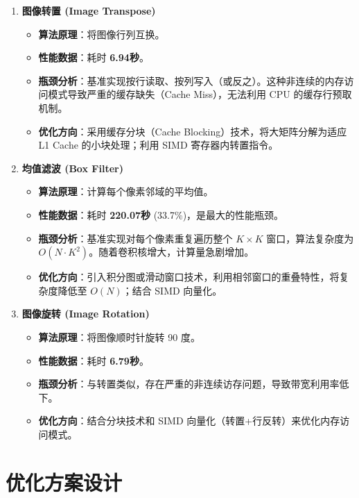 \documentclass[a4paper]{article}
\begin{document}
\begin{enumerate}
    \item \textbf{图像转置 (Image Transpose)}
    \begin{itemize}
        \item \textbf{算法原理}：将图像行列互换。
        \item \textbf{性能数据}：耗时 \textbf{6.94秒}。
        \item \textbf{瓶颈分析}：基准实现按行读取、按列写入（或反之）。这种非连续的内存访问模式导致严重的缓存缺失（Cache Miss），无法利用 CPU 的缓存行预取机制。
        \item \textbf{优化方向}：采用缓存分块（Cache Blocking）技术，将大矩阵分解为适应 L1 Cache 的小块处理；利用 SIMD 寄存器内转置指令。
    \end{itemize}

    \item \textbf{均值滤波 (Box Filter)}
    \begin{itemize}
        \item \textbf{算法原理}：计算每个像素邻域的平均值。
        \item \textbf{性能数据}：耗时 \textbf{220.07秒} (33.7\%)，是最大的性能瓶颈。
        \item \textbf{瓶颈分析}：基准实现对每个像素重复遍历整个 $K \times K$ 窗口，算法复杂度为 $O(N \cdot K^2)$。随着卷积核增大，计算量急剧增加。
        \item \textbf{优化方向}：引入积分图或滑动窗口技术，利用相邻窗口的重叠特性，将复杂度降低至 $O(N)$；结合 SIMD 向量化。
    \end{itemize}

    \item \textbf{图像旋转 (Image Rotation)}
    \begin{itemize}
        \item \textbf{算法原理}：将图像顺时针旋转 90 度。
        \item \textbf{性能数据}：耗时 \textbf{6.79秒}。
        \item \textbf{瓶颈分析}：与转置类似，存在严重的非连续访存问题，导致带宽利用率低下。
        \item \textbf{优化方向}：结合分块技术和 SIMD 向量化（转置+行反转）来优化内存访问模式。
    \end{itemize}
\end{enumerate}

\section{优化方案设计}
\end{document}
